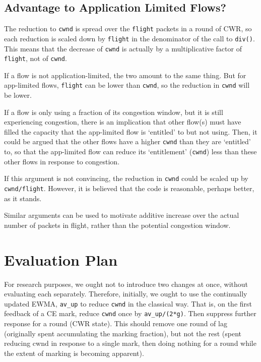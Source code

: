 \subsection{Advantage to Application Limited
	Flows?}\label{prresp_Advantage_App-Limited}

The reduction to \texttt{cwnd} is spread over the \texttt{flight} packets in a
round of CWR, so each reduction is scaled down by \texttt{flight} in the
denominator of the call to \texttt{div()}. This means that the
decrease of \texttt{cwnd} is actually by a multiplicative factor of
\texttt{flight}, not of \texttt{cwnd}.

If a flow is not application-limited, the two amount to the same thing. But for
app-limited flows, \texttt{flight} can be lower than \texttt{cwnd}, so the
reduction in \texttt{cwnd} will be lower.

If a flow is only using a fraction of its congestion window, but it is still
experiencing congestion, there is an implication that other flow(s) must have
filled the capacity that the app-limited flow is `entitled' to but not using.
Then, it could be argued that the other flows have a higher \texttt{cwnd} than
they are `entitled' to, so that the app-limited flow can reduce its
`entitlement' (\texttt{cwnd}) less than these other flows in response to
congestion.

If this argument is not convincing, the reduction in \texttt{cwnd} could be
scaled up by \texttt{cwnd/flight}. However, it is believed that the code is
reasonable, perhaps better, as it stands.

Similar arguments can be used to motivate additive increase over the actual
number of packets in flight, rather than the potential congestion window.

\section{Evaluation Plan}\label{prresp_Evaluation}

For research purposes, we ought not to introduce two changes at once, without
evaluating each separately. Therefore, initially, we ought to use the
continually updated EWMA, \texttt{av\_up} to reduce \texttt{cwnd} in the
classical way. That is, on the first feedback of a CE mark, reduce \texttt{cwnd}
once by \texttt{av\_up/(2*g)}. Then suppress further response for a round (CWR
state). This should remove one round of lag (originally spent accumulating the
marking fraction), but not the rest (spent reducing cwnd in response to a single
mark, then doing nothing for a round while the extent of marking is becoming
apparent).

